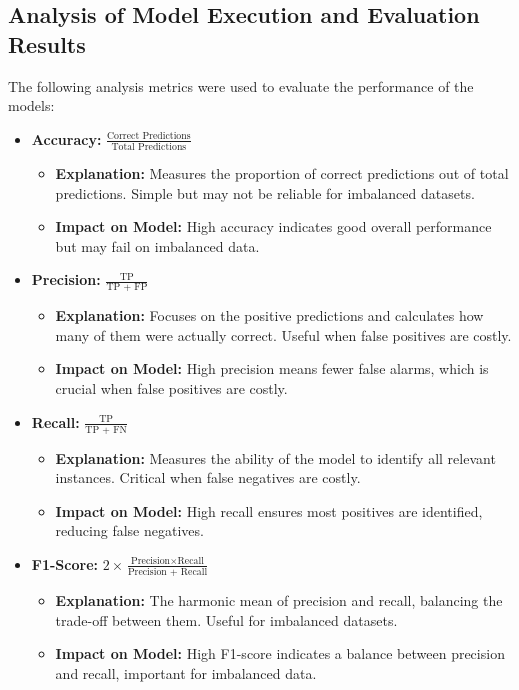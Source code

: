 \documentclass[journal]{IEEEtran}
\begin{document}
\subsection{\textbf{Analysis of Model Execution and Evaluation Results}}
The following analysis metrics were used to evaluate the performance of the models:

\begin{itemize}
    \item \textbf{Accuracy:} \( \frac{\text{Correct Predictions}}{\text{Total Predictions}} \)
    \begin{itemize}
        \item \textbf{Explanation:} Measures the proportion of correct predictions out of total predictions. Simple but may not be reliable for imbalanced datasets.
        \item \textbf{Impact on Model:} High accuracy indicates good overall performance but may fail on imbalanced data.
    \end{itemize}
    
    \item \textbf{Precision:} \( \frac{\text{TP}}{\text{TP + FP}} \)
    \begin{itemize}
        \item \textbf{Explanation:} Focuses on the positive predictions and calculates how many of them were actually correct. Useful when false positives are costly.
        \item \textbf{Impact on Model:} High precision means fewer false alarms, which is crucial when false positives are costly.
    \end{itemize}
    
    \item \textbf{Recall:} \( \frac{\text{TP}}{\text{TP + FN}} \)
    \begin{itemize}
        \item \textbf{Explanation:} Measures the ability of the model to identify all relevant instances. Critical when false negatives are costly.
        \item \textbf{Impact on Model:} High recall ensures most positives are identified, reducing false negatives.
    \end{itemize}
    
    \item \textbf{F1-Score:} \( 2 \times \frac{\text{Precision} \times \text{Recall}}{\text{Precision + Recall}} \)
    \begin{itemize}
        \item \textbf{Explanation:} The harmonic mean of precision and recall, balancing the trade-off between them. Useful for imbalanced datasets.
        \item \textbf{Impact on Model:} High F1-score indicates a balance between precision and recall, important for imbalanced data.
    \end{itemize}
    

\end{itemize}
\end{document}

